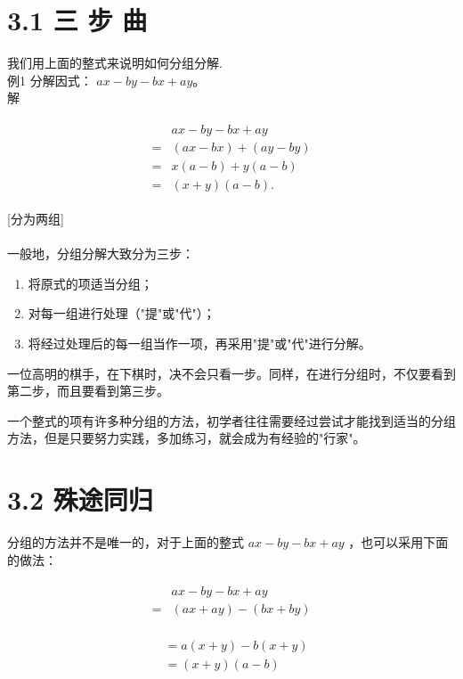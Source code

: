 \documentclass[10pt]{article}
\begin{document}
\section*{3.1 三 步 曲}
我们用上面的整式来说明如何分组分解.\\
例1 分解因式： $a x-b y-b x+a y 。$\\
解

\begin{align*}
\begin{aligned}
& a x-b y-b x+a y \\
= & (a x-b x)+(a y-b y) \\
= & x(a-b)+y(a-b) \\
= & (x+y)(a-b) .
\end{aligned}
\end{align*}

[分为两组]\\
["提"]\\
[再"提"]

一般地，分组分解大致分为三步：

\begin{enumerate}
  \item 将原式的项适当分组；
  \item 对每一组进行处理（"提"或"代"）；
  \item 将经过处理后的每一组当作一项，再采用"提"或"代"进行分解。
\end{enumerate}

一位高明的棋手，在下棋时，决不会只看一步。同样，在进行分组时，不仅要看到第二步，而且要看到第三步。

一个整式的项有许多种分组的方法，初学者往往需要经过尝试才能找到适当的分组方法，但是只要努力实践，多加练习，就会成为有经验的"行家"。

\section*{3.2 殊途同归}
分组的方法并不是唯一的，对于上面的整式 $a x-b y-b x+a y$ ，也可以采用下面的做法：

\begin{align*}
\begin{aligned}
& a x-b y-b x+a y \\
= & (a x+a y)-(b x+b y)
\end{aligned}
\end{align*}

\begin{align*}
\begin{aligned}
& =a(x+y)-b(x+y) \\
& =(x+y)(a-b)
\end{aligned}
\end{align*}
\end{document}
